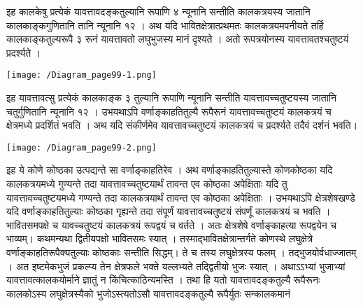 \documentclass[11pt, openany]{book}
\begin{document}
\vspace{5mm}

\begin{sloppypar}
\hangindent=0.2in \hspace{0.2in}इह कालकेषु प्रत्येकं यावत्तावदङ्कतुल्यानि रूपाणि ४ न्यूनानि सन्तीति कालकत्रयस्य जातानि कालकाङ्कगुणितानि तानि न्यूनानि १२ । अथ यदि भावितक्षेत्रात्प्रथमतः कालकत्रयमपनीयते तर्हि कालकाङ्कतुल्यरूपै ३ रूनं यावत्तावतो लघुभुजस्य मानं दृश्यते । अतो रूपत्रयोनस्य यावत्तावतश्चतुष्टयं प्रदर्श्यते ।\\

\begin{center}
\hspace{0.2in}\texttt{[image: /Diagram\_page99-1.png]}
\end{center}

\hangindent=0.2in \hspace{0.2in}इह यावत्तावत्सु प्रत्येकं कालकाङ्क ३ तुल्यानि रूपाणि न्यूनानि सन्तीति यावत्तावच्चतुष्टयस्य जातानि चतुर्गुणितानि न्यूनानि १२ । उभयथाऽपि वर्णाङ्काहतितुल्यै रूपैरूनं यावत्तावच्चतुष्टयं कालकत्रयं च क्षेत्रमध्ये प्रदर्शितं भवति । अथ यदि संकीर्णमेव यावत्तावच्चतुष्टयं कालकत्रयं च प्रदर्श्यते तदैवं दर्शनं भवति।\\

\begin{center}
\hspace{0.2in}\texttt{[image: /Diagram\_page99-2.png]}
\end{center}

\hangindent=0.2in \hspace{0.2in}इह ये कोणे कोष्ठका उत्पद्यन्ते सा वर्णाङ्काहतिरेव । अथ वर्णाङ्काहतितुल्यास्ते कोणकोष्ठका यदि कालकत्रयमध्ये गुण्यन्ते तदा यावत्तावच्चतुष्टयार्थं तावन्त एव कोष्ठका अपेक्षिताः यदि तु यावत्तावच्चतुष्टयमध्ये गण्यन्ते तदा कालकत्रयार्थं तावन्त एव कोष्ठका अपेक्षिताः । उभयथाऽपि क्षेत्रशेषखण्डे यदि वर्णाङ्काहतितुल्याः कोष्ठका गृह्यन्ते तदा संपूर्णं यावत्तावच्चतुष्टयं संपर्णूं कालकत्रयं च भवति । भावितसमपक्षे च यावच्चतुष्टयं कालकत्रयं रूपद्वयं च वर्तते । अतः क्षेत्रशेषे वर्णाङ्काहत्या रूपद्वयेन च भाव्यम्। कथमन्यथा द्वितीयपक्षो भावितसमः स्यात् । तस्माद्भावितक्षेत्रान्तर्गते कोणस्थे लघुक्षेत्रे वर्णाङ्काहतिरूपैक्यतुल्याः कोष्ठकाः सन्तीति सिद्धम्। ते च तस्य लघुक्षेत्रस्य फलम् । तद्भुजयोर्वधाज्जातम् । अत इष्टमेकभुजं प्रकल्प्य तेन क्षेत्रफले भक्ते यल्लभ्यते तद्द्वितीयो भुजः स्यात् । अथाऽऽभ्यां भुजाभ्यां यावत्तावत्कालकयोर्माने ज्ञातुं न किंचित्काठिन्यमस्ति । तथा हि यतो यावत्तावदङ्कतुल्यै रूपैरूनः कालकोऽस्य लघुक्षेत्रस्यैको भुजोऽस्त्यतोऽसौ यावत्तावदङ्कतुल्यै रूपैर्युतः सन्कालकमानं
\end{sloppypar}
\thispagestyle{empty}
\newpage
\end{document}
